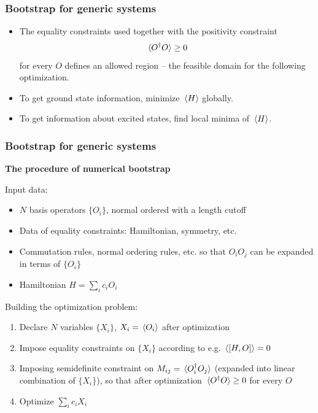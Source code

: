 \documentclass{beamer}
\begin{document}
\begin{frame}
\frametitle{Bootstrap for generic systems}

\begin{itemize}
    \item The equality constraints used together with the positivity constraint 
    \begin{equation}
        \expval*{O^\dagger O} \geq 0
    \end{equation}
    for every $O$ defines an allowed region -- the feasible domain for the following optimization.
    \item To get ground state information, minimize $\expval*{H}$ globally.
    \item To get information about excited states, find local minima of $\expval*{H}$.
\end{itemize} 

\begin{center}
    
\end{center}

\end{frame}

\begin{frame}
\frametitle{Bootstrap for generic systems}

\textbf{The procedure of numerical bootstrap}   

Input data:
\begin{itemize}
    \item $N$ basis operators $\{O_i\}$, normal ordered with a length cutoff
    \item Data of equality constraints: Hamiltonian, symmetry, etc.
    \item Commutation rules, normal ordering rules, etc. so that $O_i O_j$ can be expanded in terms of $\{O_i\}$
    \item Hamiltonian $H = \sum_i c_i O_i$
\end{itemize}

Building the optimization problem:
\begin{enumerate}
    \item Declare $N$ variables $\{X_i\}$, $X_i = \expval*{O_i}$ after optimization
    \item Impose equality constraints on $\{X_i\}$ according to e.g. $\expval*{\comm{H}{O}} = 0$ 
    \item Imposing semidefinite constraint on $M_{ij} = \expval*{O_i^\dagger O_j}$ (expanded into linear combination of $\{X_i\}$), so that after optimization $\expval*{O^\dagger O} \geq 0$ for every $O$
    \item Optimize $\sum_i c_i X_i$
\end{enumerate}

\end{frame}
\end{document}

